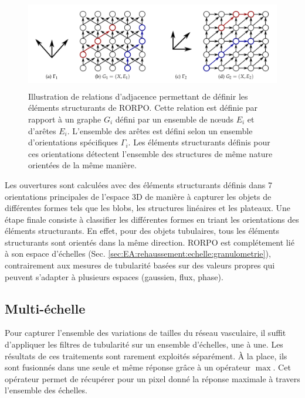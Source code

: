 \begin{figure}[ht]
\centering
\includegraphics[height=4cm]{Images/rorpo_path.png}
\caption{Illustration de relations d'adjacence permettant de définir les éléments structurants de RORPO. Cette relation est définie par rapport à un graphe $G_i$ défini par un ensemble de nœuds $E_i$ et d'arêtes $E_i$. L'ensemble des arêtes est défini selon un ensemble d'orientations spécifiques $\Gamma_i$. Les éléments structurants définis pour ces orientations détectent l'ensemble des structures de même nature orientées de la même manière.}
\label{fig:rorpo_adjacency}
\end{figure}

Les ouvertures sont calculées avec des éléments structurants définis dans 7 orientations principales de l'espace 3D de manière à capturer les objets de différentes formes tels que les blobs, les structures linéaires et les plateaux. Une étape finale consiste à classifier les différentes formes en triant les orientations des éléments structurants. En effet, pour des objets tubulaires, tous les éléments structurants sont orientés dans la même direction. RORPO est complétement lié à son espace d'échelles (Sec. \ref{sec:EA:rehaussement:echelle:granulometrie}), contrairement aux mesures de tubularité basées sur des valeurs propres qui peuvent s'adapter à plusieurs espaces (gaussien, flux, phase).


\subsection{Multi-échelle}
  \label{sec:EA:rehaussement:echelle:multiScale}

   Pour capturer l'ensemble des variations de tailles du réseau vasculaire, il suffit d'appliquer les filtres de tubularité sur un ensemble d'échelles, une à une. Les résultats de ces traitements sont rarement exploités séparément. À la place, ils sont fusionnés dans une seule et même réponse grâce à un opérateur $\max$. Cet opérateur permet de récupérer pour un pixel donné la réponse maximale à travers l'ensemble des échelles.

